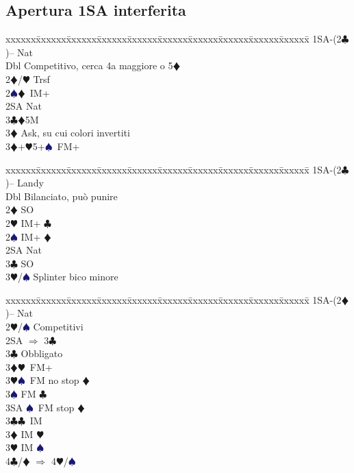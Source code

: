 \documentclass[a4paper,italian]{article}
\newcommand{\BC}{\textcolor{OliveGreen}{$\clubsuit$}}
\newcommand{\BD}{\textcolor{RedOrange}{$\vardiamondsuit$}}
\newcommand{\BH}{\textcolor{Red2}{$\varheartsuit${}}}
\newcommand{\BS}{\textcolor{MidnightBlue}{$\spadesuit${}}}
\newenvironment{bidtable}
{\begin{tabbing}

    xxxxxx\=xxxxxx\=xxxxxx\=xxxxxx\=xxxxxx\=xxxxxx\=xxxxxx\=xxxxxx\=xxxxxx\=xxxxxx\=\kill}
{\end{tabbing} }%
\begin{document}
\newpage

\begin{multicols}{2}

    \subsection{Apertura 1SA interferita}

    \begin{bidtable}
        1SA-(2\BC)-- \> \> Nat\+\\
        Dbl \> Competitivo, cerca 4a maggiore o 5\BD \\
        2\BD/\BH \> Trsf\\
        2\BS {}\BD\ IM+\\
        2SA \> Nat\\
        3\BC {}\BD 5M\+\\
        3\BD \> Ask, su cui colori invertiti\-\\
        3\BD {}+\BH 5+\BS\ FM+\-
    \end{bidtable}
    \begin{bidtable}
        1SA-(2\BC)-- \>\> Landy\+\\
        Dbl \> Bilanciato, può punire\\
        2\BD \> SO\\
        2\BH \> IM+ \BC \\
        2\BS \> IM+ \BD \\
        2SA \> Nat\\
        3\BC \> SO\\
        3\BH/\BS \> Splinter bico minore\-
    \end{bidtable}
    \begin{bidtable}
        1SA-(2\BD)-- \>\> Nat\+\\
        2\BH/\BS \> Competitivi\\
        2SA \> $\Rightarrow$ 3\BC \+\\
        3\BC \> Obbligato\+\\
        3\BD {}\BH\ FM+\\
        3\BH {}\BS\ FM no stop \BD \\
        3\BS \> FM \BC \\
        3SA \BS\ FM stop \BD \-\-\\
        3\BC {}\BC\ IM\\
        3\BD \> IM \BH \\
        3\BH \> IM \BS \\
        4\BC/\BD \> $\Rightarrow$ 4\BH /\BS \-

\end{bidtable}
\end{multicols}
\end{document}
